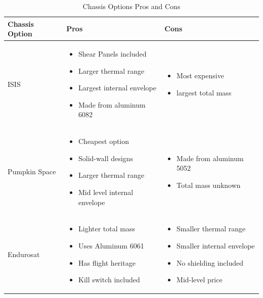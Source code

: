 \documentclass{ece}
\begin{document}
\begin{table}[H]
\centering
\begin{tabular}{|p{}|p{}|p{}|} 
\hline
\textbf{Chassis Option} & \textbf{Pros} & \textbf{Cons}
\\
\hline
     ISIS
     &
    \begin{itemize}
        \item Shear Panels included
        \item Larger thermal range
        \item Largest internal envelope
        \item Made from aluminum 6082
    \end{itemize}
    &
    \begin{itemize}
        \item Most expensive
        \item largest total mass
    \end{itemize}
    \\
\hline
     Pumpkin Space
     &
    \begin{itemize}
        \item Cheapest option
        \item Solid-wall designs
        \item Larger thermal range
        \item Mid level internal envelope
    \end{itemize}
    &
        \begin{itemize}
        \item Made from aluminum 5052
        \item Total mass unknown
    \end{itemize}
    \\
\hline
    Endurosat
    &
    \begin{itemize}
        \item Lighter total mass
        \item Uses Aluminum 6061
        \item Has flight heritage
        \item Kill switch included
    \end{itemize}
    &
    \begin{itemize}
        \item Smaller thermal range
        \item Smaller internal envelope
        \item No shielding included
        \item Mid-level price
    \end{itemize}
    \\
\hline
\end{tabular}
\caption{Chassis Options Pros and Cons}
\label{tbl:Chassis_ProCon}
\end{table}
\end{document}
